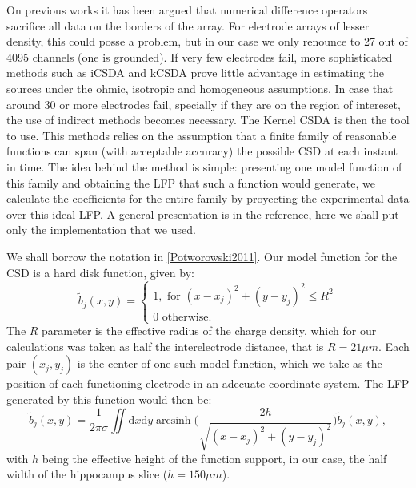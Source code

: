 \documentclass{article}
\DeclareMathOperator{\arcsinh}{arcsinh}
\newcommand{\rd}{\mathrm{d}}
\begin{document}
On previous works it has been argued that numerical difference operators sacrifice all data on the borders of the array. For electrode arrays of lesser density, this could posse a problem, but in our case we only renounce to 27 out of 4095 channels (one is grounded).
If very few electrodes fail, more sophisticated methods such as iCSDA \cite{Leski2011} and kCSDA \cite{Potworowski2011} prove little advantage in estimating the sources under the ohmic, isotropic and homogeneous assumptions. In case that around 30 or more electrodes
fail, specially if they are on the region of intereset, the use of indirect methods
becomes necessary. The Kernel CSDA is then the tool to use. This methods relies on the
assumption that a finite family of reasonable functions can span (with acceptable accuracy) the possible CSD at each instant in time. The idea behind the method is simple:
presenting one model function of this family and obtaining the LFP that such a function
would generate, we calculate the coefficients for the entire family by proyecting the
experimental data over this ideal LFP. A general presentation is in the reference, here
we shall put only the implementation that we used.

We shall borrow the notation in \ref{Potworowski2011}. Our model function for the CSD is a hard disk function, given by:
\begin{equation}
  \tilde{b}_j(x,y)=\begin{cases}
  1, \text{ for } (x-x_j)^2+(y-y_j)^2 \leq R^2 \\
  0 \text{ otherwise.}
  \end{cases}
\end{equation}
The $R$ parameter is the effective radius of the charge density, which for our
calculations was taken as half the interelectrode distance, that is $R=21 \mu m$.
Each pair $(x_j, y_j)$ is the center of one such model function, which we take as
the position of each  functioning electrode in an adecuate coordinate system.
The LFP generated by this function would then be:
\begin{equation}
  \tilde{b}_j(x,y)=\frac{1}{2\pi\sigma}
  \iint \! \rd x \rd y \arcsinh \biggr(
  \frac{2 h } {\sqrt{(x-x_j)^2+(y-y_j)^2}}
  \biggl)
  \tilde{b}_j(x,y),
\end{equation}
  with $h$ being the effective height of the function support, in our case,
  the half width of the hippocampus slice ($h=150 \mu m$).
\end{document}
